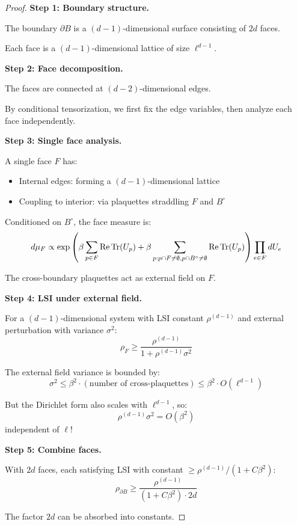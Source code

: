 \begin{proof}
\textbf{Step 1: Boundary structure.}

The boundary $\partial B$ is a $(d-1)$-dimensional surface consisting of $2d$ faces.

Each face is a $(d-1)$-dimensional lattice of size $\ell^{d-1}$.

\textbf{Step 2: Face decomposition.}

The faces are connected at $(d-2)$-dimensional edges.

By conditional tensorization, we first fix the edge variables, then analyze each 
face independently.

\textbf{Step 3: Single face analysis.}

A single face $F$ has:
\begin{itemize}
\item Internal edges: forming a $(d-1)$-dimensional lattice
\item Coupling to interior: via plaquettes straddling $F$ and $B^\circ$
\end{itemize}

Conditioned on $B^\circ$, the face measure is:
\begin{equation}
d\mu_F \propto \exp\left(\beta \sum_{p \in F} \operatorname{Re}\operatorname{Tr}(U_p) + \beta \sum_{p: p \cap F \neq \emptyset, p \cap B^\circ \neq \emptyset} \operatorname{Re}\operatorname{Tr}(U_p)\right) \prod_{e \in F} dU_e
\end{equation}

The cross-boundary plaquettes act as external field on $F$.

\textbf{Step 4: LSI under external field.}

For a $(d-1)$-dimensional system with LSI constant $\rho^{(d-1)}$ and external 
perturbation with variance $\sigma^2$:
\begin{equation}
\rho_F \geq \frac{\rho^{(d-1)}}{1 + \rho^{(d-1)} \sigma^2}
\end{equation}

The external field variance is bounded by:
\begin{equation}
\sigma^2 \leq \beta^2 \cdot (\text{number of cross-plaquettes}) \leq \beta^2 \cdot O(\ell^{d-1})
\end{equation}

But the Dirichlet form also scales with $\ell^{d-1}$, so:
\begin{equation}
\rho^{(d-1)} \sigma^2 = O(\beta^2)
\end{equation}
independent of $\ell$!

\textbf{Step 5: Combine faces.}

With $2d$ faces, each satisfying LSI with constant $\geq \rho^{(d-1)}/(1 + C\beta^2)$:
\begin{equation}
\rho_{\partial B} \geq \frac{\rho^{(d-1)}}{(1 + C\beta^2) \cdot 2d}
\end{equation}

The factor $2d$ can be absorbed into constants.
\end{proof}

